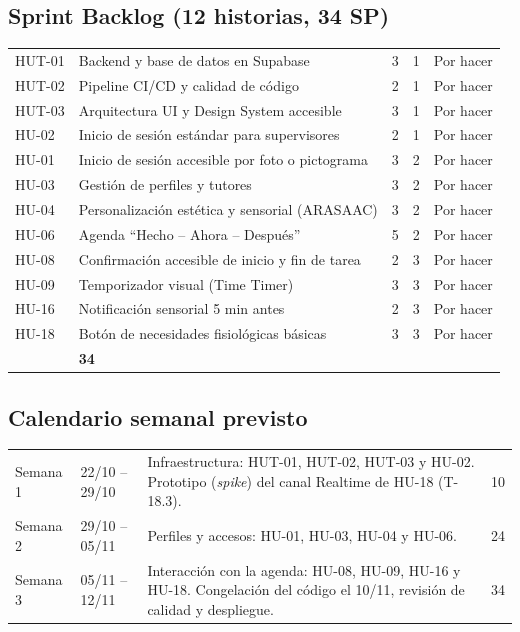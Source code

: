 \documentclass[11pt,a4paper]{article}
\begin{document}
\subsection{Sprint Backlog (12 historias, 34 SP)}
\begin{longtable}{|C{1.7cm}|P{6.6cm}|C{1.5cm}|C{1.7cm}|C{2cm}|}
\hline
{} &  &  &  &  \\ \hline
\endhead
HUT-01 & Backend y base de datos en Supabase & 3 & 1 & Por hacer \\ \hline
HUT-02 & Pipeline CI/CD y calidad de código & 2 & 1 & Por hacer \\ \hline
HUT-03 & Arquitectura UI y Design System accesible & 3 & 1 & Por hacer \\ \hline
HU-02 & Inicio de sesión estándar para supervisores & 2 & 1 & Por hacer \\ \hline
HU-01 & Inicio de sesión accesible por foto o pictograma & 3 & 2 & Por hacer \\ \hline
HU-03 & Gestión de perfiles y tutores & 3 & 2 & Por hacer \\ \hline
HU-04 & Personalización estética y sensorial (ARASAAC) & 3 & 2 & Por hacer \\ \hline
HU-06 & Agenda ``Hecho -- Ahora -- Después'' & 5 & 2 & Por hacer \\ \hline
HU-08 & Confirmación accesible de inicio y fin de tarea & 2 & 3 & Por hacer \\ \hline
HU-09 & Temporizador visual (Time Timer) & 3 & 3 & Por hacer \\ \hline
HU-16 & Notificación sensorial 5 min antes & 2 & 3 & Por hacer \\ \hline
HU-18 & Botón de necesidades fisiológicas básicas & 3 & 3 & Por hacer \\ \hline
{} & \textbf{34} & & \\ \hline
\end{longtable}

\subsection{Calendario semanal previsto}
\begin{longtable}{|P{2.9cm}|P{2.8cm}|P{6.3cm}|C{2.5cm}|}
\hline
{} &  &  &  \\ \hline
\endhead
Semana 1 & 22/10 -- 29/10 & Infraestructura: HUT-01, HUT-02, HUT-03 y HU-02. Prototipo (\textit{spike}) del canal Realtime de HU-18 (T-18.3). & 10 \\ \hline
Semana 2 & 29/10 -- 05/11 & Perfiles y accesos: HU-01, HU-03, HU-04 y HU-06. & 24 \\ \hline
Semana 3 & 05/11 -- 12/11 & Interacción con la agenda: HU-08, HU-09, HU-16 y HU-18. Congelación del código el 10/11, revisión de calidad y despliegue. & 34 \\ \hline
\end{longtable}
\end{document}
